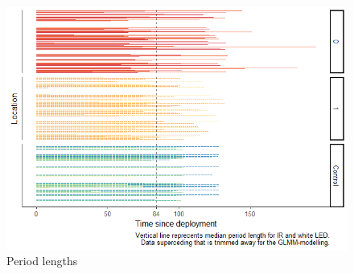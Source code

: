 
\begin{figure}
\caption{\label{fig:median_period} Period lengths}
	\centering
	\includegraphics[scale=.8]{../R/glmm_sp_files/figure-gfm/period-length-wControl-1.png}
\end{figure}


